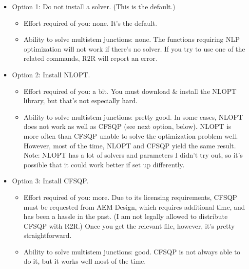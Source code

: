 \documentclass[letterpaper,12pt]{report}
\begin{document}
\begin{itemize}
\item Option 1: Do not install a solver.  (This is the default.)

\begin{itemize}
\item Effort required of you: none.  It's the default.
\item Ability to solve multistem junctions: none.  The functions requiring NLP optimization will not work if there's no solver.  If you try to use one of the related commands, R2R will report an error.
\end{itemize}

\item Option 2: Install NLOPT.

\begin{itemize}
\item 
Effort required of you: a bit.  You must download \& install the NLOPT library, but that's not especially hard.
\item Ability to solve multistem junctions: pretty good.  In some cases, NLOPT does not work as well as CFSQP (see next option, below).  NLOPT is more often than CFSQP unable to solve the optimization problem well.  However, most of the time, NLOPT and CFSQP yield the same result.  Note: NLOPT has a lot of solvers and parameters I didn't try out, so it's possible that it could work better if set up differently.
\end{itemize}
\item Option 3: Install CFSQP.

\begin{itemize}
\item 
Effort required of you: more.  Due to its licensing requirements, CFSQP must be requested from AEM Design, which requires additional time, and has been a hassle in the past.  (I am not legally allowed to distribute CFSQP with R2R.) Once you get the relevant file, however, it's pretty straightforward.
\item Ability to solve multistem junctions: good.  CFSQP is not always able to do it, but it works well most of the time.
\end{itemize}
\end{itemize}
\end{document}
